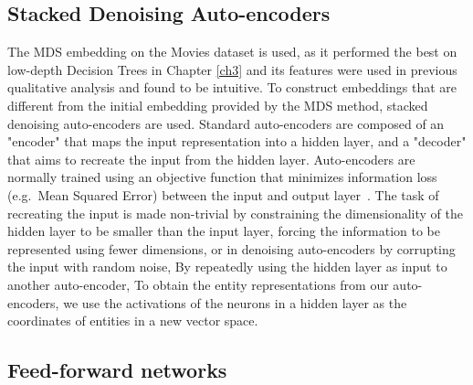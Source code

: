 


\subsection{Stacked Denoising Auto-encoders}


The MDS embedding on the Movies dataset is used, as it performed the best on low-depth Decision Trees in Chapter \ref{ch3} and its features were used in previous qualitative analysis and found to be intuitive. To construct embeddings that are different from the initial embedding provided by the MDS method, stacked denoising auto-encoders \cite{Vincent2008a} are used. Standard auto-encoders are composed of an "encoder" that maps the input representation into a hidden layer, and a "decoder" that aims to recreate the input from the hidden layer. Auto-encoders are normally trained using an objective function that minimizes information loss (e.g.\ Mean Squared Error) between the input and output layer~\cite{Bengio2009}. The task of recreating the input is made non-trivial by constraining the dimensionality of the hidden layer to be smaller than the input layer, forcing the information to be represented using fewer dimensions, or in denoising auto-encoders by corrupting the input with random noise,  By repeatedly  using the hidden layer as input to another auto-encoder,  To obtain the entity representations from our auto-encoders, we use the activations of the neurons in a hidden layer as the coordinates of entities in a new vector space. 

\subsection{Feed-forward networks}

